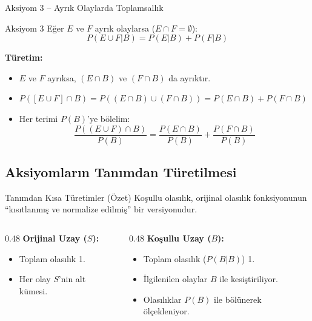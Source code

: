 \documentclass[light]{lutbeamer}
\begin{document}
\begin{frame}[fragile]{Aksiyom 3 -- Ayrık Olaylarda Toplamsallık}
    \begin{block}{Aksiyom 3}
        Eğer $E$ ve $F$ ayrık olaylarsa ($E \cap F = \emptyset$):
        \[ P(E \cup F | B) = P(E|B) + P(F|B) \]
    \end{block}

    \textbf{Türetim:}
    \begin{itemize}
        \item $E$ ve $F$ ayrıksa, $(E \cap B)$ ve $(F \cap B)$ da ayrıktır.
        \item $P([E \cup F] \cap B) = P((E \cap B) \cup (F \cap B)) = P(E \cap B) + P(F \cap B)$
        \item Her terimi $P(B)$'ye bölelim:
        \[ \frac{P((E \cup F) \cap B)}{P(B)} = \frac{P(E \cap B)}{P(B)} + \frac{P(F \cap B)}{P(B)} \]
    \end{itemize}
\end{frame}

\subsection{Aksiyomların Tanımdan Türetilmesi}
\begin{frame}{Tanımdan Kısa Türetimler (Özet)}
    Koşullu olasılık, orijinal olasılık fonksiyonunun ``kısıtlanmış ve normalize edilmiş'' bir versiyonudur.

    \vspace{0.3cm}
    \begin{columns}[T]
        \begin{column}{0.48\textwidth}
            \textbf{Orijinal Uzay ($S$):}
            \begin{itemize}
                \item Toplam olasılık 1.
                \item Her olay $S$'nin alt kümesi.
            \end{itemize}   
        \end{column}
        \begin{column}{0.48\textwidth}
             \textbf{Koşullu Uzay ($B$):}
             \begin{itemize}
                 \item Toplam olasılık ($P(B|B)$) 1.
                 \item İlgilenilen olaylar $B$ ile kesiştiriliyor.
                 \item Olasılıklar $P(B)$ ile bölünerek ölçekleniyor.
             \end{itemize}
        \end{column}
    \end{columns}
\end{frame}
\end{document}
